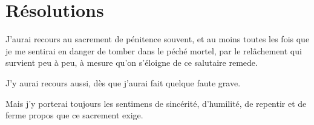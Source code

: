 \documentclass[instructions.tex]{subfiles}
\begin{document}
\section{Résolutions}
 
\primo J’aurai recours au sacrement de pénitence souvent, et au moins toutes les fois que je me sentirai en danger de tomber dans le péché mortel, par le relâchement qui survient peu à peu, à mesure qu’on s’éloigne de ce salutaire remede.
 
\secundo J’y aurai recours aussi, dès que j’aurai fait quelque faute grave.
 
\tertio Mais j’y porterai toujours les sentimens de sincérité, d’humilité, de repentir et de ferme propos que ce sacrement exige.
 
 
\end{document}

